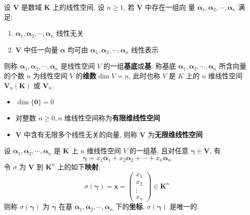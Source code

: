 \documentclass{article}
\begin{document}
				设 $\boldsymbol V$ 是数域 $\boldsymbol K$ 上的线性空间, 设 $n \geqslant 1$, 若 $\boldsymbol V$ 中存在一组向 量 $\boldsymbol{\alpha}_{1}, \boldsymbol{\alpha}_{2}, \cdots, \boldsymbol{\alpha}_{n}$ 满足:
				\begin{enumerate}
					\item $\boldsymbol{\alpha}_{1}, \boldsymbol{\alpha}_{2}, \cdots, \boldsymbol{\alpha}_{n}$ 线性无关
					\item $\boldsymbol V$ 中任一向量 $\boldsymbol{\alpha}$ 均可由 $\boldsymbol{\alpha}_{1}, \boldsymbol{\alpha}_{2}, \cdots, \boldsymbol{\alpha}_{n}$ 线性表示
				\end{enumerate}
				则称 $\boldsymbol{\alpha}_{1}, \boldsymbol{\alpha}_{2}, \cdots, \boldsymbol{\alpha}_{n}$ 是线性空间 $V$ 的一组\textbf{基底}或\textbf{基}. 称基底 $\boldsymbol{\alpha}_{1}, \boldsymbol{\alpha}_{2}, \cdots, \boldsymbol{\alpha}_{n}$ 所含向量的个数 $n$ 为线性空间 $V$ 的\textbf{维数}$\operatorname{dim} V=n$, 此时也称 $V$ 是 $K$ 上的 $n$ 维线性空间$\boldsymbol V_{n}(\boldsymbol K)$ 或 $\boldsymbol V_{n}$.
				\begin{itemize}
					\item $\operatorname{dim}\{\mathbf{0}\}=0$
					\item 对整数 $n \geqslant 0, n$ 维线性空间称为\textbf{有限维线性空间}
					\item $\boldsymbol V$ 中含有无限多个线性无关的向量, 则称 $\boldsymbol V$ 为\textbf{无限维线性空间}
				\end{itemize}
				设 $\boldsymbol{\alpha}_{1}, \boldsymbol{\alpha}_{2}, \cdots, \boldsymbol{\alpha}_{n}$ 是 $\boldsymbol K$ 上 $n$ 维线性空间 $V$ 的一组基, 且对任意 $\boldsymbol \gamma \in \boldsymbol V$, 有
				$$
				\boldsymbol \gamma=x_{1} \boldsymbol{\alpha}_{1}+x_{2} \boldsymbol{\alpha}_{2}+\cdots+x_{n} \boldsymbol{\alpha}_{n}
				$$
				令 $\sigma$ 为 $\boldsymbol V$ 到 $\boldsymbol K^{n}$ 上的如下\textbf{映射}:
				$$
				\sigma(\boldsymbol{\gamma})=\boldsymbol{x}=\left(\begin{array}{c}
					x_{1} \\
					x_{2} \\
					\vdots \\
					x_{n}
				\end{array}\right) \in \mathbf K^{n}
				$$
				则称 $\sigma(\boldsymbol{\gamma})$ 为 $\boldsymbol{\gamma}$ 在基 $\boldsymbol{\alpha}_{1}, \boldsymbol{\alpha}_{2}, \cdots, \boldsymbol{\alpha}_{n}$ 下的\textbf{坐标}, $\sigma(\boldsymbol \gamma)$ 是唯一的.
\end{document}
